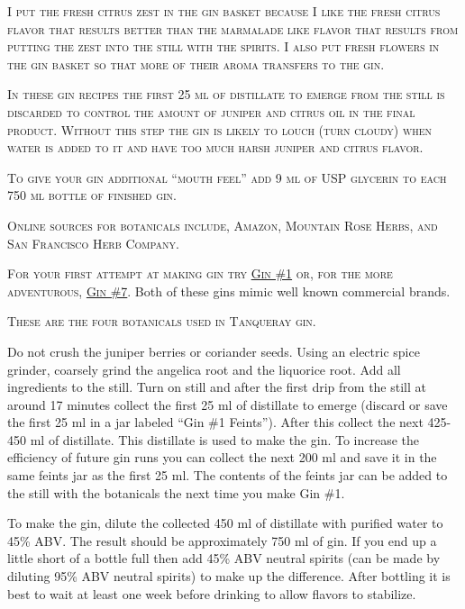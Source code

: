 \documentclass[letterpaper]{recipePMG}
\begin{document}
\textsc{I put the fresh citrus zest in the gin basket because I like the fresh citrus flavor that results better than the marmalade like flavor that results from putting the zest into the still with the spirits. I also put fresh flowers in the gin basket so that more of their aroma transfers to the gin.}

\textsc{In these gin recipes the first 25 ml of distillate to emerge from the still is discarded to control the amount of juniper and citrus oil in the final product.  Without this step the gin is likely to louch (turn cloudy) when water is added to it and have too much harsh juniper and citrus flavor. }

\textsc{To give your gin additional ``mouth feel'' add 9 ml of USP glycerin to each 750 ml bottle of finished gin.}

\textsc{Online sources for botanicals include, Amazon, Mountain Rose Herbs, and San Francisco Herb Company.}

\textsc{For your first attempt at making gin try \hyperref[GinNumber1]{Gin \#1} or, for the more adventurous, \hyperref[GinNumber7]{Gin \#7}}. Both of these gins mimic well known commercial brands. 

\newpage

\label{GinNumber1}


\textsc{These are the four botanicals used in Tanqueray gin.}

Do not crush the juniper berries or coriander seeds. Using an electric spice grinder, coarsely grind the angelica root and the liquorice root. Add all ingredients to the still.  Turn on still and after the first drip from the still at around 17 minutes collect the first 25 ml of distillate to emerge (discard or save the first 25 ml in a jar labeled ``Gin \#1 Feints'').  After this collect the next 425-450 ml of distillate. This distillate is used to make the gin. To increase the efficiency of future gin runs you can collect the next 200 ml and save it in the same feints jar as the first 25 ml. The contents of the feints jar can be added to the still with the botanicals the next time you make Gin \#1.

To make the gin, dilute the collected 450 ml of distillate with purified water to 45\% ABV. The result should be approximately 750 ml of gin. If you end up a little short of a bottle full then add 45\% ABV neutral spirits (can be made by diluting 95\% ABV neutral spirits) to make up the difference. After bottling it is best to  wait at least one week before drinking to allow flavors to stabilize.
\end{document}
